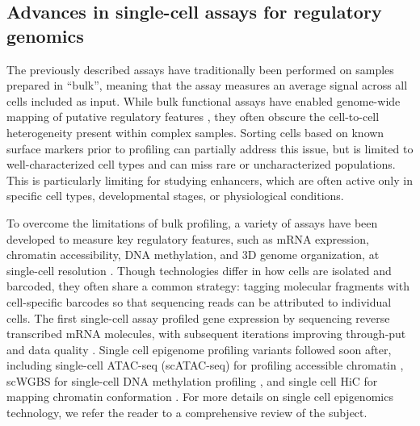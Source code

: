 \begin{dissertationintroduction}
\subsection{Advances in single-cell assays for regulatory genomics}

The previously described assays have traditionally been performed on samples prepared in “bulk”, meaning that the assay measures an average signal across all cells included as input. While bulk functional assays have enabled genome-wide mapping of putative regulatory features \cite{ENCODE_Project_Consortium2020-ns}, they often obscure the cell-to-cell heterogeneity present within complex samples. Sorting cells based on known surface markers prior to profiling can partially address this issue, but is limited to well-characterized cell types and can miss rare or uncharacterized populations. This is particularly limiting for studying enhancers, which are often active only in specific cell types, developmental stages, or physiological conditions. 

To overcome the limitations of bulk profiling, a variety of  assays have been developed to measure key regulatory features, such as mRNA expression, chromatin accessibility, DNA methylation, and 3D genome organization, at single-cell resolution \cite{Preissl2022-mq}. Though technologies differ in how cells are isolated and barcoded, they often share a common strategy: tagging molecular fragments with cell-specific barcodes so that sequencing reads can be attributed to individual cells. The first single-cell assay profiled gene expression by sequencing reverse transcribed mRNA molecules, with subsequent iterations improving through-put and data quality \cite{Lafzi2018-jm}. Single cell epigenome profiling variants followed soon after, including single-cell ATAC-seq (scATAC-seq) for profiling accessible chromatin \cite{Buenrostro2015-ox}, scWGBS for single-cell DNA methylation profiling \cite{Farlik2015-hr}, and single cell HiC for mapping chromatin conformation \cite{Nagano2013-tq}. For more details on single cell epigenomics technology, we refer the reader to a comprehensive review \cite{Preissl2022-mq} of the subject.


\end{dissertationintroduction}
